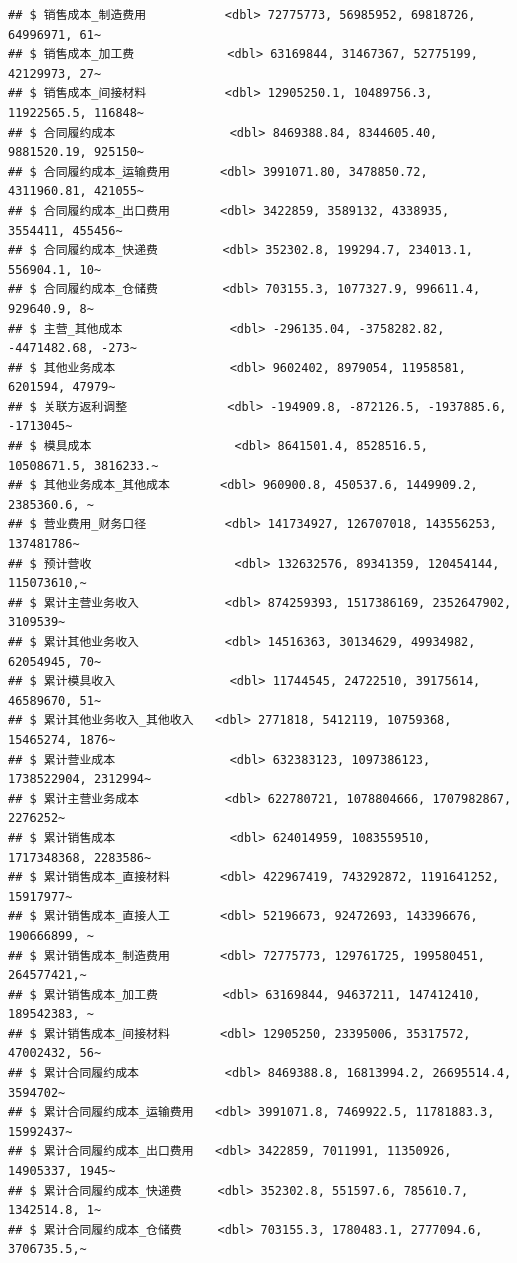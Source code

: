 \documentclass[
]{article}
\begin{document}
\begin{verbatim}
## $ 销售成本_制造费用           <dbl> 72775773, 56985952, 69818726, 64996971, 61~
## $ 销售成本_加工费             <dbl> 63169844, 31467367, 52775199, 42129973, 27~
## $ 销售成本_间接材料           <dbl> 12905250.1, 10489756.3, 11922565.5, 116848~
## $ 合同履约成本                <dbl> 8469388.84, 8344605.40, 9881520.19, 925150~
## $ 合同履约成本_运输费用       <dbl> 3991071.80, 3478850.72, 4311960.81, 421055~
## $ 合同履约成本_出口费用       <dbl> 3422859, 3589132, 4338935, 3554411, 455456~
## $ 合同履约成本_快递费         <dbl> 352302.8, 199294.7, 234013.1, 556904.1, 10~
## $ 合同履约成本_仓储费         <dbl> 703155.3, 1077327.9, 996611.4, 929640.9, 8~
## $ 主营_其他成本               <dbl> -296135.04, -3758282.82, -4471482.68, -273~
## $ 其他业务成本                <dbl> 9602402, 8979054, 11958581, 6201594, 47979~
## $ 关联方返利调整              <dbl> -194909.8, -872126.5, -1937885.6, -1713045~
## $ 模具成本                    <dbl> 8641501.4, 8528516.5, 10508671.5, 3816233.~
## $ 其他业务成本_其他成本       <dbl> 960900.8, 450537.6, 1449909.2, 2385360.6, ~
## $ 营业费用_财务口径           <dbl> 141734927, 126707018, 143556253, 137481786~
## $ 预计营收                    <dbl> 132632576, 89341359, 120454144, 115073610,~
## $ 累计主营业务收入            <dbl> 874259393, 1517386169, 2352647902, 3109539~
## $ 累计其他业务收入            <dbl> 14516363, 30134629, 49934982, 62054945, 70~
## $ 累计模具收入                <dbl> 11744545, 24722510, 39175614, 46589670, 51~
## $ 累计其他业务收入_其他收入   <dbl> 2771818, 5412119, 10759368, 15465274, 1876~
## $ 累计营业成本                <dbl> 632383123, 1097386123, 1738522904, 2312994~
## $ 累计主营业务成本            <dbl> 622780721, 1078804666, 1707982867, 2276252~
## $ 累计销售成本                <dbl> 624014959, 1083559510, 1717348368, 2283586~
## $ 累计销售成本_直接材料       <dbl> 422967419, 743292872, 1191641252, 15917977~
## $ 累计销售成本_直接人工       <dbl> 52196673, 92472693, 143396676, 190666899, ~
## $ 累计销售成本_制造费用       <dbl> 72775773, 129761725, 199580451, 264577421,~
## $ 累计销售成本_加工费         <dbl> 63169844, 94637211, 147412410, 189542383, ~
## $ 累计销售成本_间接材料       <dbl> 12905250, 23395006, 35317572, 47002432, 56~
## $ 累计合同履约成本            <dbl> 8469388.8, 16813994.2, 26695514.4, 3594702~
## $ 累计合同履约成本_运输费用   <dbl> 3991071.8, 7469922.5, 11781883.3, 15992437~
## $ 累计合同履约成本_出口费用   <dbl> 3422859, 7011991, 11350926, 14905337, 1945~
## $ 累计合同履约成本_快递费     <dbl> 352302.8, 551597.6, 785610.7, 1342514.8, 1~
## $ 累计合同履约成本_仓储费     <dbl> 703155.3, 1780483.1, 2777094.6, 3706735.5,~

\end{verbatim}
\end{document}
